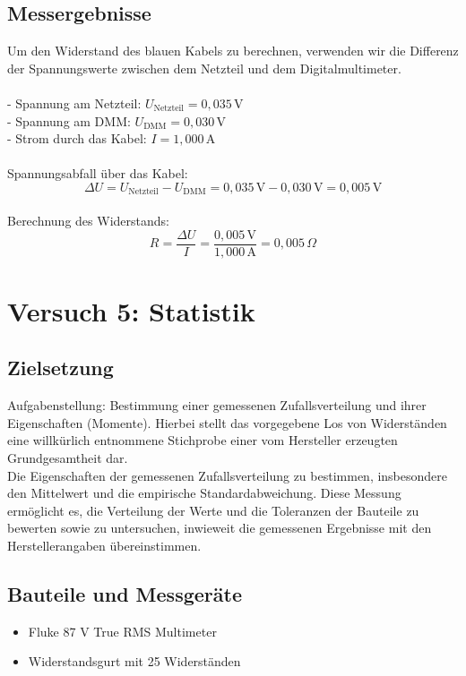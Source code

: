\documentclass[a4paper,12pt]{article}
\begin{document}
\subsection{Messergebnisse}
Um den Widerstand des blauen Kabels zu berechnen, verwenden wir die Differenz der Spannungswerte zwischen dem Netzteil und dem Digitalmultimeter.\\\\
   - Spannung am Netzteil: \( U_{\text{Netzteil}} = 0,035 \, \text{V} \) \\
   - Spannung am DMM: \( U_{\text{DMM}} = 0,030 \, \text{V} \) \\
   - Strom durch das Kabel: \( I = 1,000 \, \text{A} \) \\\\
Spannungsabfall über das Kabel:
   \[
   \Delta U = U_{\text{Netzteil}} - U_{\text{DMM}} = 0,035 \, \text{V} - 0,030 \, \text{V} = 0,005 \, \text{V}
   \]\\
Berechnung des Widerstands:
   \[
   R = \frac{\Delta U}{I} = \frac{0,005 \, \text{V}}{1,000 \, \text{A}} = 0,005 \, \Omega
   \]

\newpage
\section{Versuch 5: Statistik}
\subsection{Zielsetzung}
Aufgabenstellung: Bestimmung einer gemessenen Zufallsverteilung und ihrer Eigenschaften (Momente). Hierbei stellt
das vorgegebene Los von Widerständen eine willkürlich entnommene Stichprobe einer vom
Hersteller erzeugten Grundgesamtheit dar.\\
\noindent Die Eigenschaften der gemessenen Zufallsverteilung zu bestimmen, insbesondere den Mittelwert und die empirische Standardabweichung. Diese Messung ermöglicht es, die Verteilung der Werte und die Toleranzen der Bauteile zu bewerten sowie zu untersuchen, inwieweit die gemessenen Ergebnisse mit den Herstellerangaben übereinstimmen.


\subsection{Bauteile und Messgeräte}
\begin{itemize}
\item Fluke 87 V True RMS Multimeter
\item Widerstandsgurt mit 25 Widerständen
\end{itemize}
\end{document}
